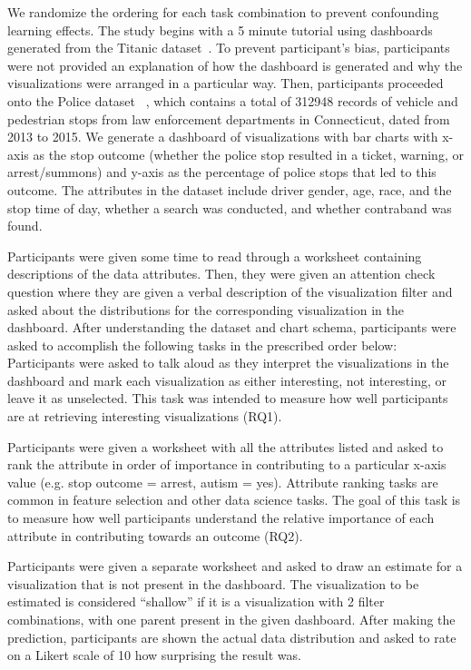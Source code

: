 \par We randomize the ordering for each task combination to prevent confounding learning effects. The study begins with a 5 minute tutorial using dashboards generated from the Titanic dataset~\cite{titanic}. To prevent participant's bias, participants were not provided an explanation of how the dashboard is generated and why the visualizations were arranged in a particular way. Then, participants proceeded onto the Police dataset~\cite{police} %
, which contains a total of 312948 records of vehicle and pedestrian stops from law enforcement departments in Connecticut, dated from 2013 to 2015. We generate a dashboard of visualizations with bar charts with x-axis as the stop outcome (whether the police stop resulted in a ticket, warning, or arrest/summons) and y-axis as the percentage of police stops that led to this outcome. The attributes in the dataset include driver gender, age, race, and the stop time of day, whether a search was conducted, and whether contraband was found.
\par Participants were given some time to read through a worksheet containing descriptions of the data attributes. Then, they were given an attention check question where they are given a verbal description of the visualization filter and asked about the distributions for the corresponding visualization in the dashboard. After understanding the dataset and chart schema, participants were asked to accomplish the following tasks in the prescribed order below:
 Participants were asked to talk aloud as they interpret the visualizations in the dashboard and mark each visualization as either interesting, not interesting, or leave it as unselected. This task was intended to measure how well participants are at retrieving interesting visualizations (RQ1).

 Participants were given a worksheet with all the attributes listed and asked to rank the attribute in order of importance in contributing to a particular x-axis value (e.g. stop outcome = arrest, autism = yes). Attribute ranking tasks are common in feature selection and other data science tasks. The goal of this task is to measure how well participants understand the relative importance of each attribute in contributing towards an outcome (RQ2).

 Participants were given a separate worksheet and asked to draw an estimate for a visualization that is not present in the dashboard. The visualization to be estimated is considered ``shallow'' if it is a visualization with 2 filter combinations, with one parent present in the given dashboard. After making the prediction, participants are shown the actual data distribution and asked to rate on a Likert scale of 10 how surprising the result was.

